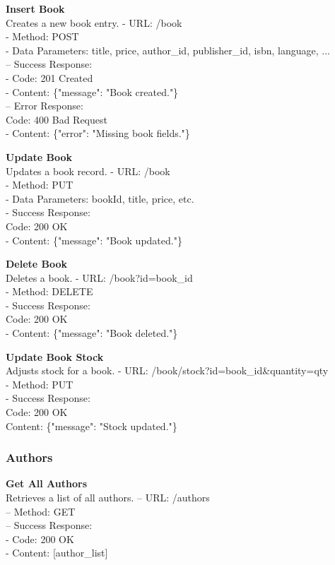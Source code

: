 \textbf{Insert Book} \\
Creates a new book entry.
- URL: /book \\
- Method: POST \\
- Data Parameters: title, price, author\_id, publisher\_id, isbn, language, ... \\
– Success Response: \\
- Code: 201 Created \\
- Content: \{"message": "Book created."\} \\
– Error Response: \\
Code: 400 Bad Request \\
- Content: \{"error": "Missing book fields."\}

\textbf{Update Book} \\
Updates a book record.
- URL: /book \\
- Method: PUT \\
- Data Parameters: bookId, title, price, etc. \\
- Success Response: \\
Code: 200 OK \\
- Content: \{"message": "Book updated."\}

\textbf{Delete Book} \\
Deletes a book.
- URL: /book?id={book\_id} \\
- Method: DELETE \\
- Success Response: \\
Code: 200 OK \\
- Content: \{"message": "Book deleted."\}

\textbf{Update Book Stock} \\
Adjusts stock for a book.
- URL: /book/stock?id={book\_id}\&quantity={qty} \\
- Method: PUT \\
- Success Response: \\
Code: 200 OK \\
Content: \{"message": "Stock updated."\}

\subsubsection*{Authors}

\textbf{Get All Authors} \\
Retrieves a list of all authors.
– URL: /authors \\
– Method: GET \\
– Success Response: \\
- Code: 200 OK \\
- Content: [author\_list]

